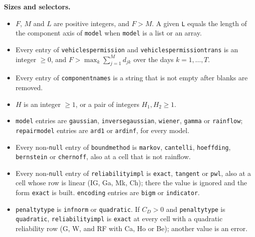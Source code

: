 \documentclass[11pt,a4paper]{article}
\theoremstyle{plain}
\theoremstyle{definition}
\renewcommand{\_}{\textunderscore\allowbreak{}}
\begin{document}
\textbf{Sizes and selectors.}
\begin{itemize}[leftmargin=1.5em]
  \item $F$, $M$ and $L$ are positive integers, and $F > M$. A given \texttt{L} equals the length of the component axis of \texttt{model} when \texttt{model} is a list or an array.
  \item Every entry of \texttt{vehicles\_per\_mission} and \texttt{vehicles\_per\_mission\_trans} is an integer $\ge 0$, and $F > \max_{k} \sum_{j=1}^{M} d_{jk}$ over the days $k = 1, \ldots, T$.
  \item Every entry of \texttt{component\_names} is a string that is not empty after blanks are removed.
  \item $H$ is an integer $\ge 1$, or a pair of integers $H_1, H_2 \ge 1$.
  \item \texttt{model} entries are \texttt{gaussian}, \texttt{inverse\_gaussian}, \texttt{wiener}, \texttt{gamma} or \texttt{rainflow}; \texttt{repair\_model} entries are \texttt{ard1} or \texttt{ardinf}, for every model.
  \item Every non-\texttt{null} entry of \texttt{bound\_method} is \texttt{markov}, \texttt{cantelli}, \texttt{hoeffding}, \texttt{bernstein} or \texttt{chernoff}, also at a cell that is not rainflow.
  \item Every non-\texttt{null} entry of \texttt{reliability\_impl} is \texttt{exact}, \texttt{tangent} or \texttt{pwl}, also at a cell whose row is linear (IG, Ga, Mk, Ch); there the value is ignored and the form \texttt{exact} is built. \texttt{encoding} entries are \texttt{bigm} or \texttt{indicator}.
  \item \texttt{penalty\_type} is \texttt{inf\_norm} or \texttt{quadratic}. If $C_D > 0$ and \texttt{penalty\_type} is \texttt{quadratic}, \texttt{reliability\_impl} is \texttt{exact} at every cell with a quadratic reliability row (G, W, and RF with Ca, Ho or Be); another value is an error.
\end{itemize}
\end{document}
